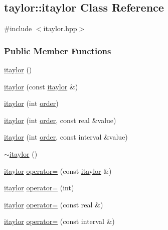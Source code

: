 \hypertarget{classtaylor_1_1itaylor}{\subsection{taylor\-:\-:itaylor \-Class \-Reference}
\label{classtaylor_1_1itaylor}
}


{\ttfamily \#include $<$itaylor.\-hpp$>$}

\subsubsection*{\-Public \-Member \-Functions}
\begin{DoxyCompactItemize}
\item 
\hyperlink{classtaylor_1_1itaylor_a265623bc1a74c5677c0b356317691808}{itaylor} ()
\item 
\hyperlink{classtaylor_1_1itaylor_a8ed680089fc56345b4f3408767099609}{itaylor} (const \hyperlink{classtaylor_1_1itaylor}{itaylor} \&)
\item 
\hyperlink{classtaylor_1_1itaylor_a887750e3c2930fedeebe83e693d71b6b}{itaylor} (int \hyperlink{classtaylor_1_1itaylor_a8a1dadee94ddf7f4c48757c02a696996}{order})
\item 
\hyperlink{classtaylor_1_1itaylor_a680b6e9e675f47fc26241800635cde08}{itaylor} (int \hyperlink{classtaylor_1_1itaylor_a8a1dadee94ddf7f4c48757c02a696996}{order}, const real \&value)
\item 
\hyperlink{classtaylor_1_1itaylor_af8c051a56aab85f0ab6fb9f38f7b34fc}{itaylor} (int \hyperlink{classtaylor_1_1itaylor_a8a1dadee94ddf7f4c48757c02a696996}{order}, const interval \&value)
\item 
\hyperlink{classtaylor_1_1itaylor_a9c5022ed34814f098555a3eae019932b}{$\sim$itaylor} ()
\item 
\hyperlink{classtaylor_1_1itaylor}{itaylor} \hyperlink{classtaylor_1_1itaylor_a7463aa323cd249c6c8cb4b008f3bd371}{operator=} (const \hyperlink{classtaylor_1_1itaylor}{itaylor} \&)
\item 
\hyperlink{classtaylor_1_1itaylor}{itaylor} \hyperlink{classtaylor_1_1itaylor_ad2d33ad63445ff588128c7c7ab81ddd2}{operator=} (int)
\item 
\hyperlink{classtaylor_1_1itaylor}{itaylor} \hyperlink{classtaylor_1_1itaylor_ac1bb1fd6de6d9216fb753bd2ba7ffc78}{operator=} (const real \&)
\item 
\hyperlink{classtaylor_1_1itaylor}{itaylor} \hyperlink{classtaylor_1_1itaylor_a34d9e7d9dadf9745471bfd5379bdc57e}{operator=} (const interval \&)

\end{DoxyCompactItemize}
